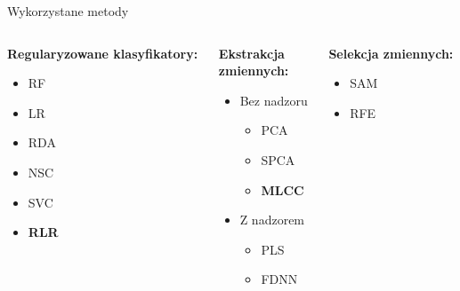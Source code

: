 \documentclass[11pt]{beamer}
\begin{document}
\begin{frame}{Wykorzystane metody}

\begin{columns}[t]
\begin{column}{0.25\linewidth}
\textcolor{darkpowderblue}{\textbf{Regularyzowane klasyfikatory:}}
\begin{itemize}
    \item RF
    \item LR
    \item RDA
    \item NSC
    \item SVC
    \item \textbf{RLR}
\end{itemize}
\end{column}
\hfill

\begin{column}{0.35\linewidth}
\textcolor{lasallegreen}{\textbf{Ekstrakcja \\zmiennych:}}
\begin{itemize}
    \item Bez nadzoru
    \begin{itemize}
        \item PCA
        \item SPCA
        \item \textbf{MLCC}
    \end{itemize}
    \item Z nadzorem
    \begin{itemize}
    \item PLS
    \item FDNN
    \end{itemize}
    \end{itemize}
\end{column}
\hfill
    

\begin{column}{0.25\linewidth}
\textcolor{lasallegreen}{\textbf{Selekcja zmiennych:}}
\begin{itemize}
    \item SAM
    \item RFE
\end{itemize}
\end{column}
    
\end{columns}
\end{frame}
\end{document}
